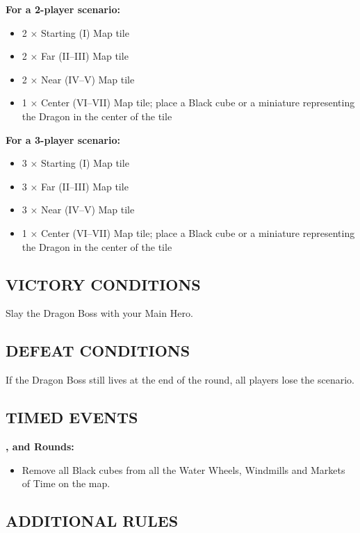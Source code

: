 \begin{multicols*}{2}
\columnbreak

\textbf{For a 2-player scenario:}
\begin{itemize}
  \item 2 × Starting (I) Map tile
  \item 2 × Far (II--III) Map tile
  \item 2 × Near (IV--V) Map tile
  \item 1 × Center (VI--VII) Map tile; place a Black cube or a miniature representing the Dragon in the center of the tile
\end{itemize}

\textbf{For a 3-player scenario:}
\begin{itemize}
  \item 3 × Starting (I) Map tile
  \item 3 × Far (II--III) Map tile
  \item 3 × Near (IV--V) Map tile
  \item 1 × Center (VI--VII) Map tile; place a Black cube or a miniature representing the Dragon in the center of the tile
\end{itemize}

\subsection*{\MakeUppercase{Victory Conditions}}
Slay the Dragon Boss with your Main Hero.

\subsection*{\MakeUppercase{Defeat Conditions}}
If the Dragon Boss still lives at the end of the  round, all players lose the scenario.

\subsection*{\MakeUppercase{Timed Events}}

\textbf{,  and  Rounds:}
\begin{itemize}
  \item Remove all Black cubes from all the Water Wheels, Windmills and Markets of Time on the map.
\end{itemize}

\subsection*{\MakeUppercase{Additional Rules}}


\end{multicols*}
